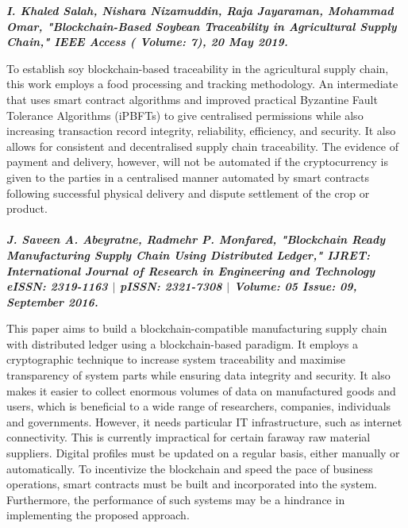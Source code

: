 \documentclass[12pt,a4paper,twocolumn,fleqn]{article}
\begin{document}
 
\textbf{\emph {I. Khaled Salah, Nishara Nizamuddin, Raja Jayaraman, Mohammad Omar, "Blockchain-Based Soybean Traceability in Agricultural Supply Chain," IEEE Access ( Volume: 7), 20 May 2019.}}

To establish soy blockchain-based traceability in the agricultural supply chain, this work employs a food processing and tracking methodology. An intermediate that uses smart contract algorithms and improved practical Byzantine Fault Tolerance Algorithms (iPBFTs) to give centralised permissions while also increasing transaction record integrity, reliability, efficiency, and security. It also allows for consistent and decentralised supply chain traceability. The evidence of payment and delivery, however, will not be automated if the cryptocurrency is given to the parties in a centralised manner automated by smart contracts following successful physical delivery and dispute settlement of the crop or product. \\ \\
 
 
\textbf{\emph {J. Saveen A. Abeyratne, Radmehr P. Monfared, "Blockchain Ready Manufacturing Supply Chain Using Distributed Ledger," IJRET: International Journal of Research in Engineering and Technology eISSN: 2319-1163 $|$ pISSN: 2321-7308 $|$ Volume: 05 Issue: 09, September 2016.}}

This paper aims to build a blockchain-compatible manufacturing supply chain with distributed ledger using a blockchain-based paradigm. It employs a cryptographic technique to increase system traceability and maximise transparency of system parts while ensuring data integrity and security. It also makes it easier to collect enormous volumes of data on manufactured goods and users, which is beneficial to a wide range of researchers, companies, individuals and governments. However, it needs particular IT infrastructure, such as internet connectivity. This is currently impractical for certain faraway raw material suppliers. Digital profiles must be updated on a regular basis, either manually or automatically. To incentivize the blockchain and speed the pace of business operations, smart contracts must be built and incorporated into the system. Furthermore, the performance of such systems may be a hindrance in implementing the proposed approach.
 
\end{document}
